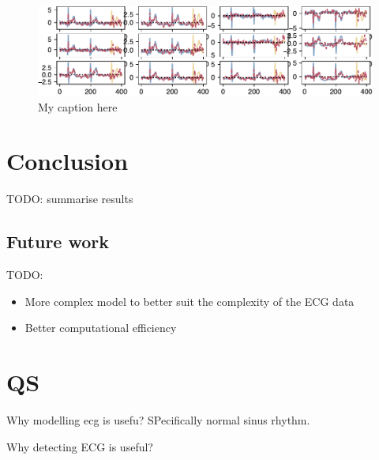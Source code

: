 \documentclass{mldsmsc}
\begin{document}
\begin{figure}[H]
\begin{center}
\includegraphics[scale=1]{images/periodic_fit_1500_6_6_150it.pdf}
\caption{My caption here}
\label{somelabelforreference}
\end{center}
\end{figure}

\chapter{Conclusion}

TODO: summarise results

\section{Future work}

TODO:
\begin{itemize}
    \item More complex model to better suit the complexity of the ECG data
    \item Better computational efficiency
\end{itemize}

\chapter{QS}

Why modelling ecg is usefu? SPecifically normal sinus rhythm.

Why detecting ECG is useful?

\clearpage
\renewcommand*{\thepage}{A\arabic{page}}

%
%




\end{document}
